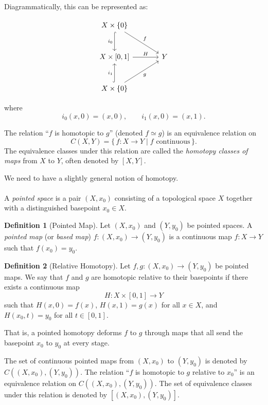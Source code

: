\documentclass[11pt]{article}
\theoremstyle{definition}
\newtheorem{definition}{Definition}[section]
\theoremstyle{plain}
\begin{document}
Diagrammatically, this can be represented as:

\[
    \begin{tikzcd}[row sep=large, column sep=large]
        X \times \{0\} \arrow[d,hook,"i_0"'] \arrow[dr,"f"] & \\
        X \times [0,1] \arrow[r,"H"] & Y \\
        X \times \{0\} \arrow[u,hook,"i_1"] \arrow[ur,"g"'] &
    \end{tikzcd}
\]

where
\[
    i_0(x,0) = (x,0), \qquad i_1(x,0) = (x,1).
\]

The relation ``$f$ is homotopic to $g$'' (denoted $f \simeq g$) is an equivalence relation on
\[
    C(X,Y) = \{\, f : X \to Y \mid f \text{ continuous} \,\}.
\]
The equivalence classes under this relation are called the \emph{homotopy classes of maps} from $X$ to $Y$, often denoted by $[X,Y]$.

We need to have a slightly general notion of homotopy.

\paragraph{}
A \emph{pointed space} is a pair $(X, x_0)$ consisting of a topological space $X$ together with a distinguished basepoint $x_0 \in X$.

\begin{definition}[Pointed Map]
    Let $(X, x_0)$ and $(Y, y_0)$ be pointed spaces. A \emph{pointed map} (or \emph{based map}) $f : (X, x_0) \to (Y, y_0)$ is a continuous map $f : X \to Y$ such that $f(x_0) = y_0$.
\end{definition}

\begin{definition}[Relative Homotopy]
    Let $f, g : (X, x_0) \to (Y, y_0)$ be pointed maps. We say that $f$ and $g$ are homotopic relative to their basepoints if there exists a continuous map
    \[
        H : X \times [0,1] \to Y
    \]
    such that $H(x,0) = f(x)$, $H(x,1) = g(x)$ for all $x \in X$, and $H(x_0, t) = y_0$ for all $t \in [0,1]$.
\end{definition}

That is, a pointed homotopy deforms $f$ to $g$ through maps that all send the basepoint $x_0$ to $y_0$ at every stage.

The set of continuous pointed maps from $(X, x_0)$ to $(Y, y_0)$ is denoted  by $C((X, x_0), (Y, y_0))$.
The relation ``$f$ is  homotopic to $g$ relative to $x_0$''  is an equivalence relation on $C((X, x_0), (Y, y_0))$.
The set of  equivalence classes under this relation is denoted by $[(X, x_0), (Y, y_0)]$.
\end{document}

